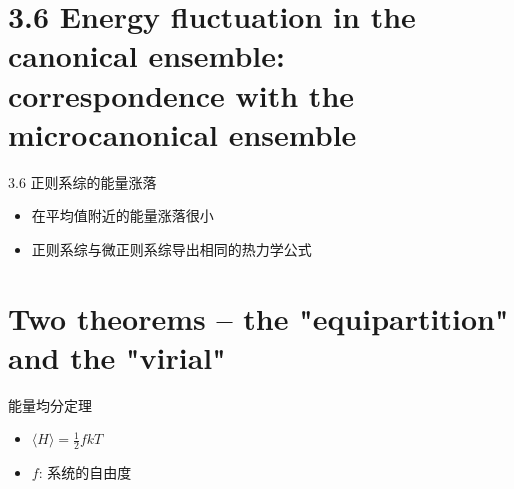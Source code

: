 \documentclass{ctexbeamer}
\begin{document}
\section{3.6 Energy fluctuation in the canonical ensemble: correspondence with the microcanonical ensemble}
\begin{frame}{3.6 正则系综的能量涨落}
    \begin{itemize}
        \item 在平均值附近的能量涨落很小
        \item 正则系综与微正则系综导出相同的热力学公式
    \end{itemize}
\end{frame}
\section{Two theorems -- the "equipartition" and the "virial"}
\begin{frame}{能量均分定理}
\begin{itemize}
    \item $\langle H \rangle = \frac{1}{2} fkT$
    \item $f$: 系统的自由度
\end{itemize}
\end{frame}
\end{document}
